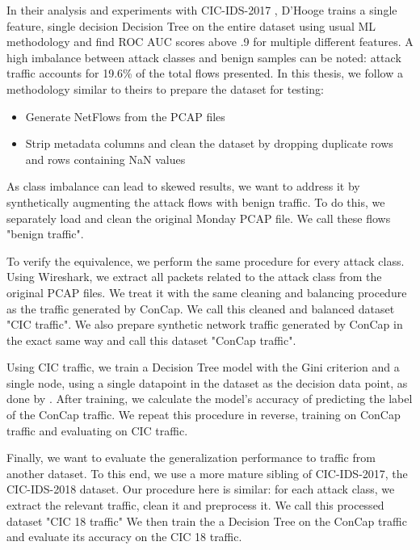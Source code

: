 In their analysis and experiments with CIC-IDS-2017 \cite{distrinet_cic_analysis}, D'Hooge trains a single feature, single decision Decision Tree on the entire dataset using usual ML methodology and find ROC AUC scores above .9 for multiple different features. A high imbalance between attack classes and benign samples can be noted: attack traffic accounts for 19.6\% of the total flows presented. 
In this thesis, we follow a methodology similar to theirs to prepare the dataset for testing:
\begin{itemize}
	\item Generate NetFlows from the PCAP files
	\item Strip metadata columns and clean the dataset by dropping duplicate rows and rows containing NaN values
\end{itemize}

As class imbalance can lead to skewed results, we want to address it by synthetically augmenting the attack flows with benign traffic. To do this, we separately load and clean the original Monday PCAP file. We call these flows "benign traffic". 

To verify the equivalence, we perform the same procedure for every attack class.
Using Wireshark, we extract all packets related to the attack class from the original PCAP files. We treat it with the same cleaning and balancing procedure as the traffic generated by ConCap. We call this cleaned and balanced dataset "CIC traffic". We also prepare synthetic network traffic generated by ConCap in the exact same way and call this dataset "ConCap traffic".

Using CIC traffic, we train a Decision Tree model with the Gini criterion and a single node, using a single datapoint in the dataset as the decision data point, as done by \cite{distrinet_cic_analysis}. After training, we calculate the model's accuracy of predicting the label of the ConCap traffic. We repeat this procedure in reverse, training on ConCap traffic and evaluating on CIC traffic.

Finally, we want to evaluate the generalization performance to traffic from another dataset. To this end, we use a more mature sibling of CIC-IDS-2017, the CIC-IDS-2018 dataset. Our procedure here is similar: for each attack class, we extract the relevant traffic, clean it and preprocess it. We call this processed dataset "CIC 18 traffic" We then train the a Decision Tree on the ConCap traffic and evaluate its accuracy on the CIC 18 traffic.

